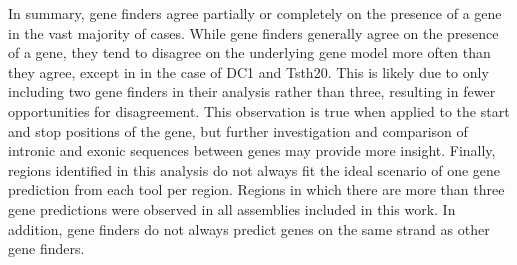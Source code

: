 In summary, gene finders agree partially or completely on the presence
of a gene in the vast majority of cases. While gene finders generally
agree on the presence of a gene, they tend to disagree on the
underlying gene model more often than they agree, except in in the
case of DC1 and Tsth20. This is likely due to only including two gene
finders in their analysis rather than three, resulting in fewer
opportunities for disagreement. This observation is true when applied
to the start and stop positions of the gene, but further investigation
and comparison of intronic and exonic sequences between genes may
provide more insight. Finally, regions identified in this analysis do
not always fit the ideal scenario of one gene prediction from each
tool per region. Regions in which there are more than three gene
predictions were observed in all assemblies included in this work. In
addition, gene finders do not always predict genes on the same strand
as other gene finders.
